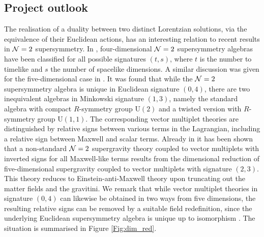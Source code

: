 \subsection{Project outlook}

The realisation of a duality between two distinct Lorentzian solutions, via the equivalence of their Euclidean actions, has an interesting relation to recent results in ${\cal N}=2$ supersymmetry. In \cite{Gall:2019mfa}, four-dimensional ${\cal N}=2$ supersymmetry algebras have been classified for all possible signatures $(t,s)$, where $t$ is the number to timelike and $s$ the number of spacelike dimensions. A similar discussion was given for the five-dimensional case in \cite{Gall:2018ogw}. It was found that while the ${\cal N}=2$ supersymmetry algebra is unique in Euclidean signature $(0,4)$, there are two inequivalent algebras in Minkowski signature $(1,3)$, namely the standard algebra with compact $R$-symmetry group U$(2)$ and a twisted version with $R$-symmetry group U$(1,1)$. The corresponding vector multiplet theories are distinguished by relative signs between various terms in the Lagrangian, including a relative sign between Maxwell and scalar terms. Already in \cite{Sabra:2017xvx} it has been shown that a non-standard ${\cal N}=2$ supergravity theory coupled to vector multiplets with inverted signs for all Maxwell-like terms results from the dimensional reduction of five-dimensional supergravity coupled to vector multiplets with signature $(2,3)$. This theory reduces to Einstein-anti-Maxwell theory upon truncating out the matter fields and the gravitini. We remark that while vector multiplet theories in signature $(0,4)$ can likewise be obtained in two ways from five dimensions, the resulting relative signs can be removed by a suitable field redefinition, since the underlying Euclidean  supersymmetry algebra is unique up to isomorphism \cite{Gall:2019mfa}. The situation is summarised in Figure \ref{Fig:dim_red}.



